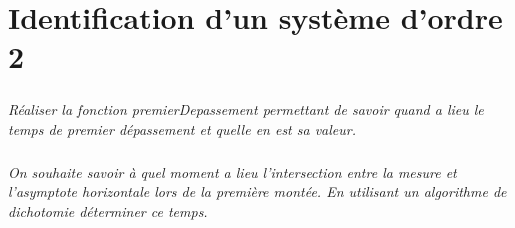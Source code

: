 \documentclass[10pt]{article}
\begin{document}
\section{Identification d'un système d'ordre 2}
\subparagraph{}
\textit{Réaliser la fonction \textsf{premierDepassement} permettant de savoir quand a lieu le temps de premier dépassement et quelle en est sa valeur.}

\subparagraph{}
\textit{On souhaite savoir à quel moment a lieu l'intersection entre la mesure et l'asymptote horizontale lors de la première montée. En utilisant un algorithme de dichotomie déterminer ce temps.}
\end{document}
